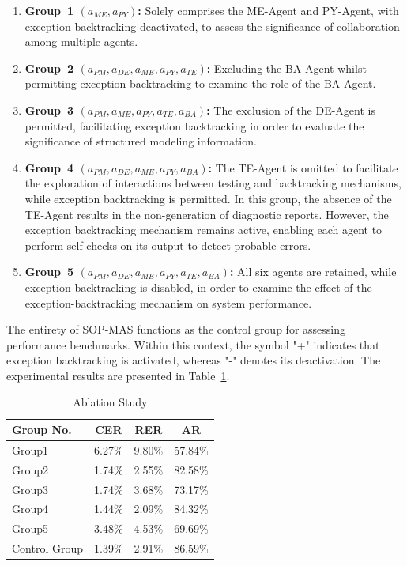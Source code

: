 \documentclass[preprint,12pt]{elsarticle}
\begin{document}
\begin{enumerate}[label=\arabic*)]
    \item \textbf{Group~1 $(a_{ME}, a_{PY})$:} Solely comprises the ME-Agent and PY-Agent, with exception backtracking deactivated, to assess the significance of collaboration among multiple agents.

    \item \textbf{Group~2 $(a_{PM}, a_{DE}, a_{ME}, a_{PY}, a_{TE})$:} Excluding the BA-Agent whilst permitting exception backtracking to examine the role of the BA-Agent.

    \item \textbf{Group~3 $(a_{PM}, a_{ME}, a_{PY}, a_{TE}, a_{BA})$:} The exclusion of the DE-Agent is permitted, facilitating exception backtracking in order to evaluate the significance of structured modeling information.

    \item \textbf{Group~4 $(a_{PM}, a_{DE}, a_{ME}, a_{PY}, a_{BA})$:} The TE-Agent is omitted to facilitate the exploration of interactions between testing and backtracking mechanisms, while exception backtracking is permitted. In this group, the absence of the TE-Agent results in the non-generation of diagnostic reports. However, the exception backtracking mechanism remains active, enabling each agent to perform self-checks on its output to detect probable errors.

    \item \textbf{Group~5 $(a_{PM}, a_{DE}, a_{ME}, a_{PY}, a_{TE}, a_{BA})$:} All six agents are retained, while exception backtracking is disabled, in order to examine the effect of the exception-backtracking mechanism on system performance.
\end{enumerate}
The entirety of SOP-MAS functions as the control group for assessing performance benchmarks. Within this context, the symbol "+" indicates that exception backtracking is activated, whereas "-" denotes its deactivation. The experimental results are presented in Table~\ref{tab:ablation}.

\begin{table}[htbp]
    \centering
    \caption{Ablation Study}\label{tab:ablation}
    \begin{tabular}{lccc}
        \hline
        Group No. & CER & RER & AR \\
        \hline
        Group1 & 6.27\% & 9.80\% & 57.84\% \\
        Group2 & 1.74\% & 2.55\% & 82.58\% \\
        Group3 & 1.74\% & 3.68\% & 73.17\% \\
        Group4 & 1.44\% & 2.09\% & 84.32\% \\
        Group5 & 3.48\% & 4.53\% & 69.69\% \\
        Control Group & 1.39\% & 2.91\% & 86.59\% \\
        \hline
    \end{tabular}
\end{table}
\end{document}
